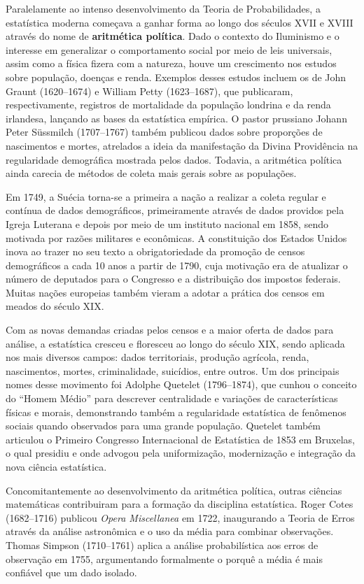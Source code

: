 Paralelamente ao intenso desenvolvimento da Teoria de Probabilidades, a estatística moderna
começava a ganhar forma ao longo dos séculos XVII e XVIII através do nome de
\textbf{aritmética política}.
Dado o contexto do Iluminismo e o interesse em generalizar o comportamento social
por meio de leis universais, assim como a física fizera com a natureza, houve um
crescimento nos estudos sobre população, doenças e renda.
Exemplos desses estudos incluem os de John Graunt (1620--1674) e William Petty
(1623--1687), que publicaram, respectivamente, registros de mortalidade da população
londrina e da renda irlandesa, lançando as bases da estatística empírica.
O pastor prussiano Johann Peter Süssmilch (1707--1767) também publicou dados sobre proporções
de nascimentos e mortes, atrelados a ideia da manifestação da Divina Providência
na regularidade demográfica mostrada pelos dados.
Todavia, a aritmética política ainda carecia de métodos de coleta mais gerais sobre as
populações.

Em 1749, a Suécia torna-se a primeira a nação a realizar a coleta regular e contínua de
dados demográficos, primeiramente através de dados providos pela Igreja Luterana e depois
por meio de um instituto nacional em 1858, sendo motivada por razões militares e econômicas.
A constituição dos Estados Unidos inova ao trazer no seu texto a obrigatoriedade da
promoção de censos demográficos a cada 10 anos a partir de 1790, cuja motivação era de
atualizar o número de deputados para o Congresso e a distribuição dos impostos federais.
Muitas nações europeias também vieram a adotar a prática dos censos em meados do século
XIX.

Com as novas demandas criadas pelos censos e a maior oferta de dados para análise,
a estatística cresceu e floresceu ao longo do século XIX, sendo aplicada nos mais
diversos campos: dados territoriais, produção agrícola, renda, nascimentos, mortes,
criminalidade, suicídios, entre outros.
Um dos principais nomes desse movimento foi Adolphe Quetelet (1796--1874), que cunhou o conceito do
``Homem Médio'' para descrever centralidade e variações de características físicas e
morais, demonstrando também a regularidade estatística de fenômenos sociais quando
observados para uma grande população.
Quetelet também articulou o Primeiro Congresso Internacional de Estatística de 1853 em
Bruxelas, o qual presidiu e onde advogou pela uniformização, modernização e integração
da nova ciência estatística.

Concomitantemente ao desenvolvimento da aritmética política, outras ciências matemáticas
contribuiram para a formação da disciplina estatística.
Roger Cotes (1682--1716) publicou \textit{Opera Miscellanea} em 1722, inaugurando a
Teoria de Erros através da análise astronômica e o uso da média para combinar observações.
Thomas Simpson (1710--1761) aplica a análise probabilística aos erros de observação em 1755,
argumentando formalmente o porquê a média é mais confiável que um dado isolado.

